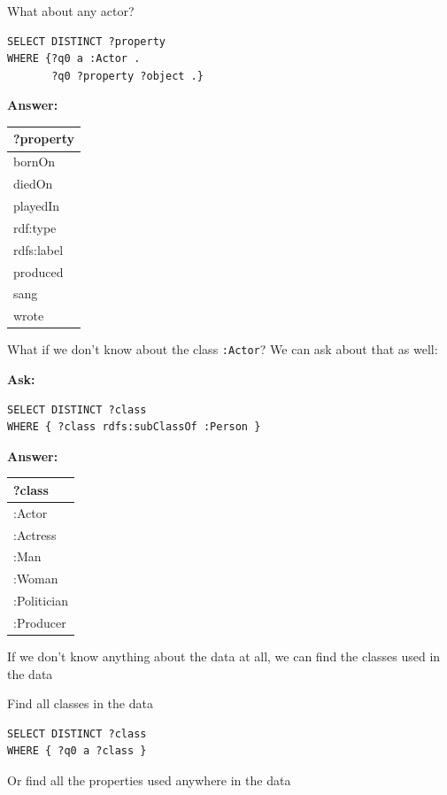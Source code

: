 \begin{query}What about any actor?\end{query}

\begin{lstlisting}
SELECT DISTINCT ?property
WHERE {?q0 a :Actor .
       ?q0 ?property ?object .}
\end{lstlisting}

\textbf{\textbf{Answer:}}

\begin{tabular}{|l|}
\hline
?property\\
\hline
bornOn\\
diedOn\\
playedIn\\
rdf:type\\
rdfs:label\\
produced\\
sang\\
wrote\\
\hline
\end{tabular}

What if we don't know about the class \texttt{:Actor}? We can ask about that as
well:

\textbf{\textbf{Ask:}}

\begin{lstlisting}
SELECT DISTINCT ?class
WHERE { ?class rdfs:subClassOf :Person }
\end{lstlisting}

\textbf{\textbf{Answer:}}

\begin{tabular}{|l|}
\hline
?class\\
\hline
:Actor\\
:Actress\\
:Man\\
:Woman\\
:Politician\\
:Producer\\
\hline
\end{tabular}

If we don't know anything about the data at all, we can find the classes
used in the data

\begin{query}Find all classes in the data\end{query}
\begin{lstlisting}
SELECT DISTINCT ?class
WHERE { ?q0 a ?class }
\end{lstlisting}

Or find all the properties used anywhere in the data

